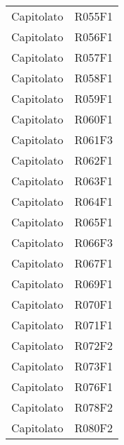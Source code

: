 \documentclass[../analisi-dei-requisiti.tex]{subfiles}
\begin{document}
\begin{longtable}[H]{c|c}
                                Capitolato & R055F1                               \\
                                Capitolato & R056F1                               \\
                                Capitolato & R057F1                               \\
                                Capitolato & R058F1                               \\
                                Capitolato & R059F1                               \\
                                Capitolato & R060F1                               \\
                                Capitolato & R061F3                               \\
                                Capitolato & R062F1                               \\
                                Capitolato & R063F1                               \\
                                Capitolato & R064F1                               \\
                                Capitolato & R065F1                               \\
                                Capitolato & R066F3                               \\
                                Capitolato & R067F1                               \\
                                Capitolato & R069F1                               \\
                                Capitolato & R070F1                               \\
                                Capitolato & R071F1                               \\
                                Capitolato & R072F2                               \\
                                Capitolato & R073F1                               \\
                                Capitolato & R076F1                               \\
                                Capitolato & R078F2                               \\
                                Capitolato & R080F2                               \\

\end{longtable}
\end{document}
